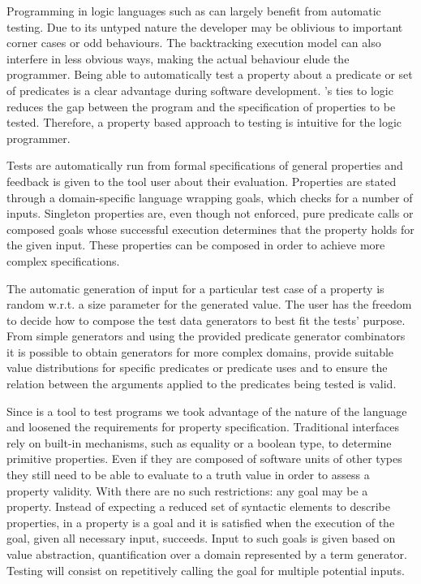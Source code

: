 Programming in logic languages such as \Prolog{} can largely benefit
from automatic testing.
%
Due to its untyped nature the developer may be oblivious to important
corner cases or odd behaviours.
%
The backtracking execution model can also interfere in less obvious
ways, making the actual behaviour elude the programmer.
%
Being able to automatically test a property about a predicate or set of
predicates is a clear advantage during software development.
%
\Prolog{}'s ties to logic reduces the gap between the program and the
specification of properties to be tested.
%
Therefore, a property based approach to testing is intuitive for the
logic programmer.  


Tests are automatically run from formal specifications of general
properties and feedback is given to the tool user about their
evaluation.
%
Properties are stated through a domain-specific language wrapping
\Prolog{} goals, which \plqc{} checks for a number of inputs.
%
Singleton properties are, even though not enforced, pure predicate calls
or composed goals whose successful execution determines that the
property holds for the given input.
%
These properties can be composed in order to achieve more complex
specifications.


The automatic generation of input for a particular test case of a
property is random w.r.t. a size parameter for the generated value.
%
The user has the freedom to decide how to compose the test data
generators to best fit the tests' purpose.
%
From simple generators and using the provided predicate generator
combinators it is possible to obtain generators for more complex
domains, provide suitable value distributions for specific predicates or
predicate uses and to ensure the relation between the arguments applied
to the predicates being tested is valid.


Since \plqc{} is a tool to test \Prolog{} programs we took advantage of
the nature of the language and loosened the requirements for property
specification.
%
Traditional interfaces rely on built-in mechanisms, such as equality or
a boolean type, to determine primitive properties.
%
Even if they are composed of software units of other types they still
need to be able to evaluate to a truth value in order to assess a
property validity.
%
With \Prolog{} there are no such restrictions: any goal may be a property.
%
Instead of expecting a reduced set of syntactic elements to describe
properties, in \plqc{} a property is a goal and it is satisfied when
the execution of the goal, given all necessary input, succeeds.
%
Input to such goals is given based on \plqc{} value abstraction,
quantification over a domain represented by a term generator.
%
Testing will consist on repetitively calling the goal for multiple
potential inputs.


